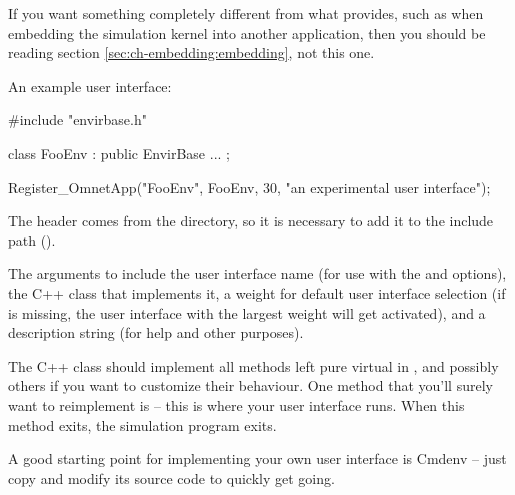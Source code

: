 \begin{note}
If you want something completely different from what 
provides, such as when embedding the simulation kernel into another
application, then you should be reading section \ref{sec:ch-embedding:embedding},
not this one.
\end{note}

An example user interface:

\begin{cpp}
#include "envirbase.h"

class FooEnv : public EnvirBase
{
    ...
};

Register_OmnetApp("FooEnv", FooEnv, 30, "an experimental user interface");
\end{cpp}

The  header comes from the  directory,
so it is necessary to add it to the include path ().

The arguments to  include the user interface name
(for use with the  and  options),
the C++ class that implements it, a weight for default user interface selection
(if  is missing, the user interface with the largest weight will get
activated), and a description string (for help and other purposes).

The C++ class should implement all methods left pure virtual in
, and possibly others if you want to customize
their behaviour. One method that you'll surely want to reimplement is
 -- this is where your user interface runs. When this method
exits, the simulation program exits.

\begin{note}
A good starting point for implementing your own user interface is
Cmdenv -- just copy and modify its source code to quickly get going.
\end{note}



